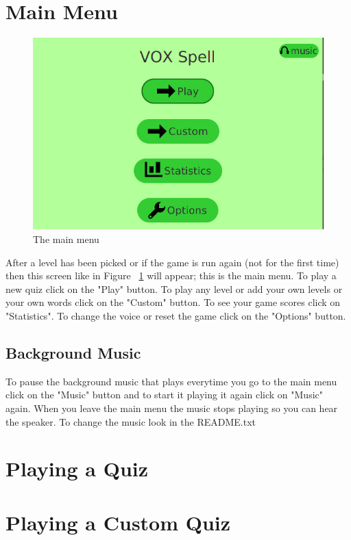 \documentclass[12pt,a4paper,titlepage,onecolumn]{article}
\begin{document}
	\section{Main Menu}
	\begin{figure}[h]
	\centering
	\includegraphics[width=1\linewidth]{"Figures/Main Menu/MainMenuGeneral"}
	\caption[Main Menu]{The main menu}
	\label{fig:MainMenuGeneral}
	\end{figure}
	After a level has been picked or if the game is run again (not for the first time) then this screen like in Figure ~\ref{fig:MainMenuGeneral} will appear; this is the main menu. To play a new quiz click on the "Play" button. To play any level or add your own levels or your own words click on the "Custom" button. To see your game scores click on "Statistics". To change the voice or reset the game click on the "Options" button. 
	\subsection{Background Music}
	To pause the background music that plays everytime you go to the main menu click on the "Music" button and to start it playing it again click on "Music" again. When you leave the main menu the music stops playing so you can hear the speaker. To change the music look in the README.txt
	
	\section{Playing a Quiz}

	\section{Playing a Custom Quiz}
		
\end{document}
